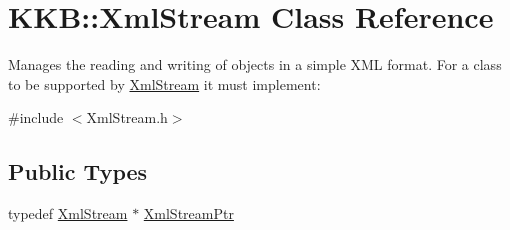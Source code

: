 \hypertarget{class_k_k_b_1_1_xml_stream}{}\section{K\+KB\+:\+:Xml\+Stream Class Reference}
\label{class_k_k_b_1_1_xml_stream}


Manages the reading and writing of objects in a simple X\+ML format. For a class to be supported by \hyperlink{class_k_k_b_1_1_xml_stream}{Xml\+Stream} it must implement\+:  




{\ttfamily \#include $<$Xml\+Stream.\+h$>$}

\subsection*{Public Types}
\begin{DoxyCompactItemize}
\item 
typedef \hyperlink{class_k_k_b_1_1_xml_stream}{Xml\+Stream} $\ast$ \hyperlink{class_k_k_b_1_1_xml_stream_ae184ca80435ddeade4130fb7ccd7a422}{Xml\+Stream\+Ptr}
\end{DoxyCompactItemize}

